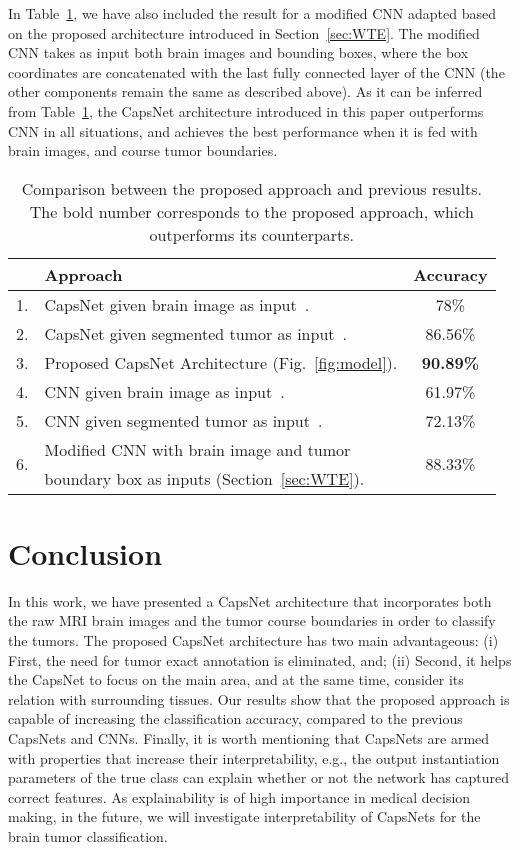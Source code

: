 \documentclass{article}
\begin{document}
In Table~\ref{tab:comp}, we have also included the result for a modified CNN adapted based on the proposed architecture introduced in Section~\ref{sec:WTE}. The modified CNN takes as input both brain images and bounding boxes, where the box coordinates are concatenated with the last fully connected layer of the CNN (the other components remain the same as described above). As it can be inferred from Table~\ref{tab:comp}, the CapsNet architecture introduced in this paper outperforms CNN in all situations, and achieves the best performance when it is fed with brain images, and course tumor boundaries.

\begin{table}[t!]
\caption{\footnotesize Comparison between the proposed approach and previous results. The bold number corresponds to the proposed approach, which outperforms its counterparts.}
\vspace{.05in}
\label{tab:comp}
\centering
\begin{tabular}{|c|l|c|}
\hline
& \textbf{Approach} & \textbf{Accuracy} \\
\hline
1. & CapsNet given brain image as input~\cite{Parnian:ICIP18}. & 78\% \\
\hline
2. & CapsNet given segmented tumor as input~\cite{Parnian:ICIP18}.& {86.56\%} \\
\hline
3. & Proposed CapsNet Architecture (Fig.~\ref{fig:model}). & \textbf{90.89\%}\\
\hline
4. & CNN given brain image as input~\cite{Justin:2017}. & 61.97\%\\
\hline
5. & CNN given segmented tumor as input~\cite{Justin:2017}. & 72.13\%\\
\hline
\multirow{ 2}{*}{6.} & Modified CNN with brain image and tumor & \multirow{ 2}{*}{88.33\%}\\
&  boundary box as inputs (Section~\ref{sec:WTE}). &\\
\hline
\end{tabular}
\vspace{-.15in}
\end{table}
\section{Conclusion}  \label{sec:con}
In this work, we have presented a CapsNet architecture that incorporates both the raw MRI brain images and the tumor course boundaries in order to classify the tumors. The proposed CapsNet architecture has two main advantageous: (i) First, the need for tumor exact annotation is eliminated, and; (ii) Second, it helps the CapsNet to focus on the main area, and at the same time, consider its relation with surrounding tissues. Our results show that the proposed approach is capable of increasing the classification accuracy, compared to the previous CapsNets and CNNs. Finally, it is worth mentioning that CapsNets are armed with properties that increase their interpretability, e.g.,  the output instantiation parameters of the true class can explain whether or not the network has captured correct features. As explainability is of high importance in medical decision making, in the future, we will investigate interpretability of CapsNets for the brain tumor classification.
\end{document}
